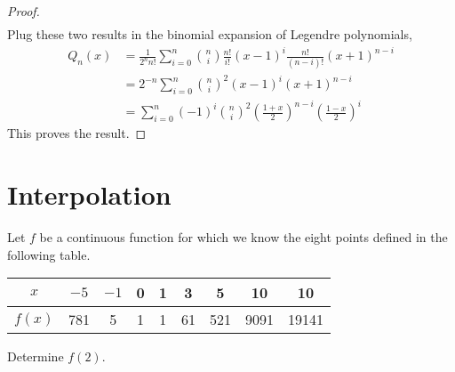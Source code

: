 \begin{enumerate}
\begin{proof}
\begin{align*}
	\end{align*}
	Plug these two results in the binomial expansion of Legendre polynomials,
	\begin{align*}
	Q_n(x)&=\frac{1}{2^nn!}\sum_{i=0}^{n}\binom{n}{i}\frac{n!}{i!}(x-1)^i\frac{n!}{(n-i)!}(x+1)^{n-i}\\
	&=2^{-n}\sum_{i=0}^{n}\binom{n}{i}^2(x-1)^i(x+1)^{n-i}\\
	&=\sum_{i=0}^{n}(-1)^i \binom{n}{i}^2 \left(\frac{1+x}{2}\right)^{n-i} \left(\frac{1-x}{2}\right)^{i}
	\end{align*}
	This proves the result.
	\end{proof}
\end{enumerate}


\section{Interpolation}
Let $f$ be a continuous function for which we know the eight points defined in the following table.
\begin{center}
	\begin{tabular}{ccccccccc}
	\hline
	$x$ & $-5$ & $-1$ & 0 & 1 & 3 & 5 & 10 & 10 \\ \hline
	$f(x)$ & 781 & 5 & 1 & 1 & 61 & 521 & 9091 & 19141 \\ \hline
	\end{tabular}
\end{center}
Determine $f(2)$.
